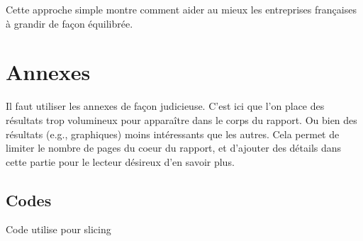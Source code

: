 \documentclass[mstat,12pt]{unswthesis}
\begin{document}
Cette approche simple montre comment aider au mieux les entreprises
françaises à grandir de façon équilibrée.

\chapter*{Annexes}\label{annexes}

Il faut utiliser les annexes de façon judicieuse. C'est ici que l'on
place des résultats trop volumineux pour apparaître dans le corps du
rapport. Ou bien des résultats (e.g., graphiques) moins intéressants que
les autres. Cela permet de limiter le nombre de pages du coeur du
rapport, et d'ajouter des détails dans cette partie pour le lecteur
désireux d'en savoir plus.

\section*{\texorpdfstring{\textbf{Codes}}{Codes}}\label{codes}

\tiny

Code utilise pour slicing

\medskip

\label{codeR_slicing}
\end{document}
